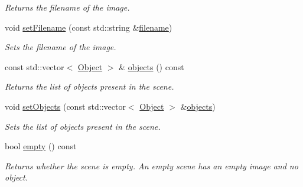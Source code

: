 \begin{DoxyCompactItemize}
\begin{DoxyCompactList}\small\item\em Returns the filename of the image. \end{DoxyCompactList}\item 
\hypertarget{class_f_f_l_d_1_1_scene_a0513b9d65c9caeb905384486a6618922}{void \hyperlink{class_f_f_l_d_1_1_scene_a0513b9d65c9caeb905384486a6618922}{set\-Filename} (const std\-::string \&\hyperlink{class_f_f_l_d_1_1_scene_ababad2108f7abba4268b22c27e083bfc}{filename})}\label{class_f_f_l_d_1_1_scene_a0513b9d65c9caeb905384486a6618922}

\begin{DoxyCompactList}\small\item\em Sets the filename of the image. \end{DoxyCompactList}\item 
\hypertarget{class_f_f_l_d_1_1_scene_a86fc9dd7daab4c755fcabf5babba1992}{const std\-::vector$<$ \hyperlink{class_f_f_l_d_1_1_object}{Object} $>$ \& \hyperlink{class_f_f_l_d_1_1_scene_a86fc9dd7daab4c755fcabf5babba1992}{objects} () const }\label{class_f_f_l_d_1_1_scene_a86fc9dd7daab4c755fcabf5babba1992}

\begin{DoxyCompactList}\small\item\em Returns the list of objects present in the scene. \end{DoxyCompactList}\item 
\hypertarget{class_f_f_l_d_1_1_scene_a5972118cdb9d1e7b5f085adaa09b69d3}{void \hyperlink{class_f_f_l_d_1_1_scene_a5972118cdb9d1e7b5f085adaa09b69d3}{set\-Objects} (const std\-::vector$<$ \hyperlink{class_f_f_l_d_1_1_object}{Object} $>$ \&\hyperlink{class_f_f_l_d_1_1_scene_a86fc9dd7daab4c755fcabf5babba1992}{objects})}\label{class_f_f_l_d_1_1_scene_a5972118cdb9d1e7b5f085adaa09b69d3}

\begin{DoxyCompactList}\small\item\em Sets the list of objects present in the scene. \end{DoxyCompactList}\item 
\hypertarget{class_f_f_l_d_1_1_scene_a39ff6312cbbb74924b3f1766de85a7d9}{bool \hyperlink{class_f_f_l_d_1_1_scene_a39ff6312cbbb74924b3f1766de85a7d9}{empty} () const }\label{class_f_f_l_d_1_1_scene_a39ff6312cbbb74924b3f1766de85a7d9}

\begin{DoxyCompactList}\small\item\em Returns whether the scene is empty. An empty scene has an empty image and no object. \end{DoxyCompactList}\end{DoxyCompactItemize}


